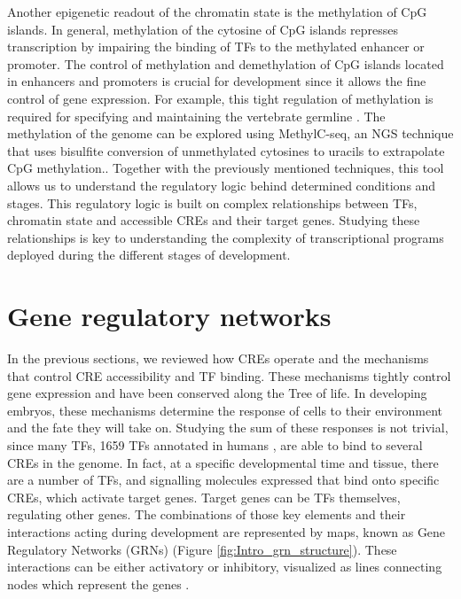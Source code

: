 Another epigenetic readout of the chromatin state is the methylation of CpG islands. In general, methylation of the cytosine of CpG islands represses transcription \parencite{greenberg_diverse_2019} by impairing the binding of TFs to the methylated enhancer or promoter. The control of methylation and demethylation of CpG islands located in enhancers and promoters is crucial for development since it allows the fine control of gene expression. For example, this tight regulation of methylation is required for specifying and maintaining the vertebrate germline \parencite{bogdanovic_dna_2017, bogdanovic_dynamics_2012, bogdanovic_active_2016}. The methylation of the genome can be explored using MethylC-seq, an NGS technique that uses bisulfite conversion of unmethylated cytosines to uracils to extrapolate CpG methylation.\parencite{bogdanovic_dna_2017}. Together with the previously mentioned techniques, this tool allows us to understand the regulatory logic behind determined conditions and stages. This regulatory logic is built on complex relationships between TFs, chromatin state and accessible CREs and their target genes. Studying these relationships is key to understanding the complexity of transcriptional programs deployed during the different stages of development. 




\section{Gene regulatory networks}

In the previous sections, we reviewed how CREs operate and the mechanisms that control CRE accessibility and TF binding. These mechanisms tightly control gene expression and have been conserved along the Tree of life. In developing embryos, these mechanisms determine the response of cells to their environment and the fate they will take on. Studying the sum of these responses is not trivial, since many TFs, 1659 TFs annotated in humans \parencite{shen_animaltfdb_2023}, are able to bind to several CREs in the genome. In fact, at a specific developmental time and tissue, there are a number of TFs, and signalling molecules expressed that bind onto specific CREs, which activate target genes. Target genes can be TFs themselves, regulating other genes. The combinations of those key elements and their interactions acting during development are represented by maps, known as Gene Regulatory Networks (GRNs) (Figure \ref{fig:Intro_grn_structure}). These interactions can be either activatory or inhibitory, visualized as lines connecting nodes which represent the genes  \parencite{levine_gene_2005}. 

